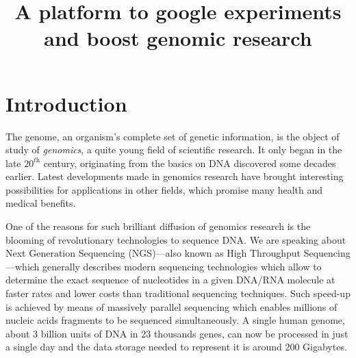 \documentclass[journal]{IEEEtran}
\begin{document}
\title{A platform to google experiments \\and boost genomic research}

\author{
}

\maketitle

\begin{abstract}


\end{abstract}



\IEEEpeerreviewmaketitle



\section{Introduction}
\label{sec:intro}
The genome, an organism's complete set of genetic information, is the object of study of \textit{genomics}, a quite young field of scientific research. It only began in the late $\textit{20}^{\textit{th}}$ century, originating from the basics on DNA discovered some decades earlier.  Latest developments made in genomics research have brought interesting possibilities for applications in other fields, which promise many health and medical benefits.

One of the reasons for such brilliant diffusion of genomics research is the blooming of revolutionary technologies to sequence DNA. We are speaking about Next Generation Sequencing (NGS)---also known as High Throughput Sequencing---which generally describes modern sequencing technologies which allow to determine the exact sequence of nucleotides in a given DNA/RNA molecule at faster rates and lower costs than traditional sequencing techniques. Such speed-up is achieved by means of massively parallel sequencing which enables millions of nucleic acids fragments to be sequenced simultaneously.
A single human genome, about 3 billion units of DNA in 23 thousands genes,  can now be processed in just a single day and the data storage needed to represent it is around 200 Gigabytes.
\end{document}
